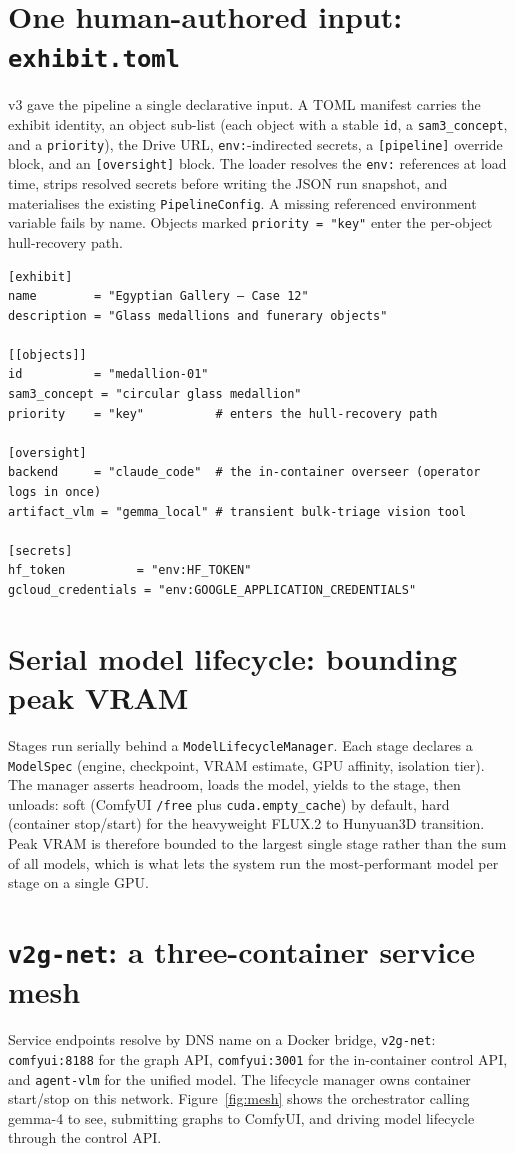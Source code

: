 \documentclass[a4paper,11pt]{report}
\newcommand{\code}[1]{\texttt{#1}}
\begin{document}
\section{One human-authored input: \texttt{exhibit.toml}}
v3 gave the pipeline a single declarative input. A TOML manifest carries the exhibit identity, an object
sub-list (each object with a stable \code{id}, a \code{sam3\_concept}, and a \code{priority}), the Drive
URL, \code{env:}-indirected secrets, a \code{[pipeline]} override block, and an \code{[oversight]} block.
The loader resolves the \code{env:} references at load time, strips resolved secrets before writing the JSON
run snapshot, and materialises the existing \code{PipelineConfig}. A missing referenced environment
variable fails by name. Objects marked \code{priority = "key"} enter the per-object hull-recovery path.

\begin{lstlisting}[caption={Illustrative exhibit.toml fragments (ADR-013/015).}]
[exhibit]
name        = "Egyptian Gallery — Case 12"
description = "Glass medallions and funerary objects"

[[objects]]
id          = "medallion-01"
sam3_concept = "circular glass medallion"
priority    = "key"          # enters the hull-recovery path

[oversight]
backend     = "claude_code"  # the in-container overseer (operator logs in once)
artifact_vlm = "gemma_local" # transient bulk-triage vision tool

[secrets]
hf_token          = "env:HF_TOKEN"
gcloud_credentials = "env:GOOGLE_APPLICATION_CREDENTIALS"
\end{lstlisting}

\section{Serial model lifecycle: bounding peak VRAM}
Stages run serially behind a \code{ModelLifecycleManager}. Each stage declares a \code{ModelSpec} (engine,
checkpoint, VRAM estimate, GPU affinity, isolation tier). The manager asserts headroom, loads the model,
yields to the stage, then unloads: soft (ComfyUI \code{/free} plus \code{cuda.empty\_cache}) by default,
hard (container stop/start) for the heavyweight FLUX.2 to Hunyuan3D transition. Peak VRAM is therefore
bounded to the largest single stage rather than the sum of all models, which is what lets the system run the
most-performant model per stage on a single GPU.

\section{\texttt{v2g-net}: a three-container service mesh}
Service endpoints resolve by DNS name on a Docker bridge, \code{v2g-net}: \code{comfyui:8188} for the graph
API, \code{comfyui:3001} for the in-container control API, and \code{agent-vlm} for the unified model. The
lifecycle manager owns container start/stop on this network. Figure~\ref{fig:mesh} shows the orchestrator
calling gemma-4 to see, submitting graphs to ComfyUI, and driving model lifecycle through the control API.
\end{document}
